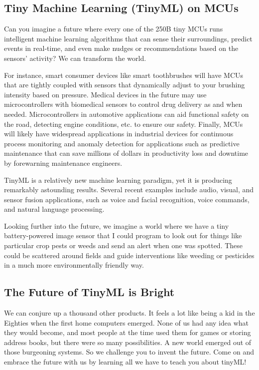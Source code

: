 \subsection{Tiny Machine Learning (TinyML) on MCUs}

Can you imagine a future where every one of the 250B tiny MCUs runs intelligent machine learning algorithms that can sense their surroundings, predict events in real-time, and even make nudges or recommendations based on the sensors’ activity? We can transform the world.

For instance, smart consumer devices like smart toothbrushes will have MCUs that are tightly coupled with sensors that dynamically adjust to your brushing intensity based on pressure. Medical devices in the future may use microcontrollers with biomedical sensors to control drug delivery as and when needed. Microcontrollers in automotive applications can aid functional safety on the road, detecting engine conditions, etc. to ensure our safety. Finally, MCUs will likely have widespread applications in industrial devices for continuous process monitoring and anomaly detection for applications such as predictive maintenance that can save millions of dollars in productivity loss and downtime by forewarning maintenance engineers.

TinyML is a relatively new machine learning paradigm, yet it is producing remarkably astounding results. Several recent examples include audio, visual, and sensor fusion applications, such as voice and facial recognition, voice commands, and natural language processing.

Looking further into the future, we imagine a world where we have a tiny battery-powered image sensor that I could program to look out for things like particular crop pests or weeds and send an alert when one was spotted. These could be scattered around fields and guide interventions like weeding or pesticides in a much more environmentally friendly way.

\subsection{The Future of TinyML is Bright}

We can conjure up a thousand other products. It feels a lot like being a kid in the Eighties when the first home computers emerged. None of us had any idea what they would become, and most people at the time used them for games or storing address books, but there were so many possibilities. A new world emerged out of those burgeoning systems. So we challenge you to invent the future. Come on and embrace the future with us by learning all we have to teach you about tinyML!

